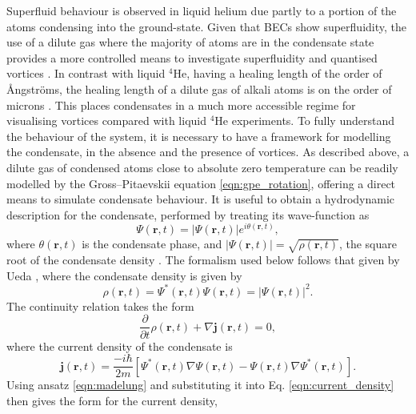 Superfluid behaviour is observed in liquid helium due partly to a portion of the atoms condensing into the ground-state. Given that BECs show superfluidity, the use of a dilute gas where the majority of atoms are in the condensate state provides a more controlled means to investigate superfluidity and quantised vortices \cite{BK:Ueda_2010,BEC:Srinivasen_pramana_2006,Vtx:Tsubota_arxiv_2010,CT:Tsubota_jpsj_2008}. In contrast with liquid $^4$He, having a healing length of the order of {\r{A}}ngstr{\"o}ms, the healing length of a dilute gas of alkali atoms is on the order of microns \cite{Vtx:Isoshima_pra_1999}. This places condensates in a much more accessible regime for visualising vortices compared with liquid $^4$He experiments. To fully understand the behaviour of the system, it is necessary to have a framework for modelling the condensate, in the absence and the presence of vortices. As described above, a dilute gas of condensed atoms close to absolute zero temperature can be readily modelled by the Gross--Pitaevskii equation \eqref{eqn:gpe_rotation}, offering a direct means to simulate condensate behaviour. It is useful to obtain a hydrodynamic description for the condensate, performed by treating its wave-function as
\begin{equation}\label{eqn:madelung}
\Psi(\textbf{r},t) = \vert\Psi(\textbf{r},t)\vert e^{i\theta(\textbf{r},t)},
\end{equation}
where $\theta(\textbf{r},t)$ is the condensate phase, and $\vert\Psi(\textbf{r},t)\vert=\sqrt{\rho(\textbf{r},t)}$, the square root of the condensate density \cite[~chap. 1]{BK:Pitaevskii_Stringari_2003}.
The formalism used below follows that given by Ueda \cite{BK:Ueda_2010}, where the condensate density is given by
\begin{equation}\label{eqn:density}
\rho(\textbf{r},t) = \Psi^*(\textbf{r},t)\Psi(\textbf{r},t) = \vert \Psi (\textbf{r},t) \vert ^2.
\end{equation}
The continuity relation takes the form
\begin{equation}\label{eqn:continuity}
\frac{\partial}{\partial t}\rho(\textbf{r},t)  + \nabla \textbf{j}(\textbf{r},t) = 0,
\end{equation}
where the current density of the condensate is
\begin{equation}\label{eqn:current_density}
\textbf{j}(\textbf{r},t) = \frac{-i\hbar}{2m}\left[\Psi^*(\textbf{r},t)\nabla\Psi(\textbf{r},t) - \Psi(\textbf{r},t)\nabla\Psi^*(\textbf{r},t)\right].
\end{equation}
Using ansatz \eqref{eqn:madelung} and substituting it into Eq. \eqref{eqn:current_density} then gives the form for the current density,
